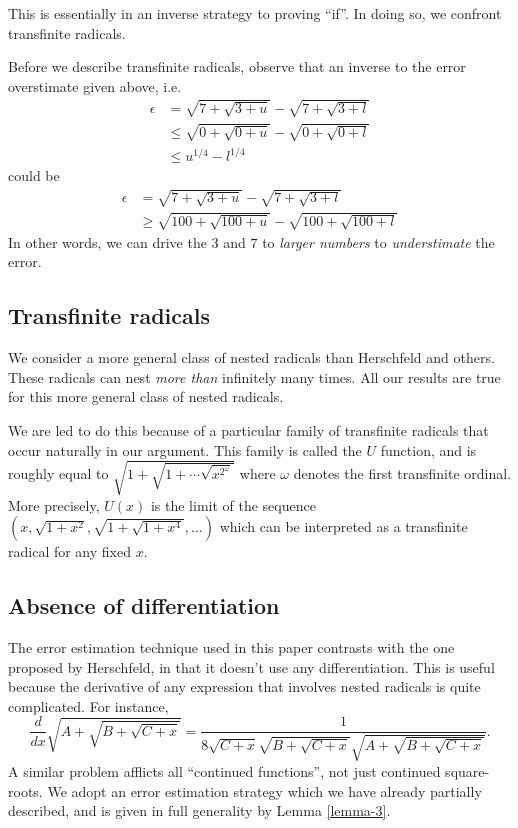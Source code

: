 \documentclass[
]{article}
\theoremstyle{theorem}
\theoremstyle{lemma}
\theoremstyle{corollary}
\theoremstyle{remark}
\theoremstyle{definition}
\begin{document}
This is essentially in an inverse strategy to proving ``if''. In doing so, we confront transfinite radicals.

Before we describe transfinite radicals, observe that an inverse to the error overstimate given above, i.e. \[\begin{aligned}
\epsilon &= \sqrt{7 + \sqrt{3 + u}} - \sqrt{7 + \sqrt{3 + l}} \\
&\leq \sqrt{0 + \sqrt{0 + u}} - \sqrt{0 + \sqrt{0 + l}} \\
&\leq u^{1/4} - l^{1/4}
\end{aligned}\] could be \[\begin{aligned}
\epsilon &= \sqrt{7 + \sqrt{3 + u}} - \sqrt{7 + \sqrt{3 + l}} \\
&\geq \sqrt{100 + \sqrt{100 + u}} - \sqrt{100 + \sqrt{100 + l}}
\end{aligned}\] In other words, we can drive the \(3\) and \(7\) to \emph{larger numbers} to \emph{understimate} the error.

\hypertarget{transfinite-radicals}{%
\subsection{Transfinite radicals}\label{transfinite-radicals}}

We consider a more general class of nested radicals than Herschfeld and others. These radicals can nest \emph{more than} infinitely many times. All our results are true for this more general class of nested radicals.

We are led to do this because of a particular family of transfinite radicals that occur naturally in our argument. This family is called the \(U\) function, and is roughly equal to \(\sqrt{1 + \sqrt{1 + \dotsb \sqrt{x^{2^\omega}}}}\) where \(\omega\) denotes the first transfinite ordinal. More precisely, \(U(x)\) is the limit of the sequence \((x, \sqrt{1+x^2}, \sqrt{1 + \sqrt{1 + x^4}}, \dotsc)\) which can be interpreted as a transfinite radical for any fixed \(x\).

\hypertarget{absence-of-differentiation}{%
\subsection{Absence of differentiation}\label{absence-of-differentiation}}

The error estimation technique used in this paper contrasts with the one proposed by Herschfeld, in that it doesn't use any differentiation. This is useful because the derivative of any expression that involves nested radicals is quite complicated. For instance, \[\frac{d}{dx}\sqrt{A + \sqrt{B + \sqrt{C + x}}} = \frac 1{8 \sqrt{C + x} \sqrt{B + \sqrt{C + x}} \sqrt{A + \sqrt{B + \sqrt{C + x}}}}.\] A similar problem afflicts all ``continued functions'', not just continued square-roots. We adopt an error estimation strategy which we have already partially described, and is given in full generality by Lemma \ref{lemma-3}.
\end{document}
